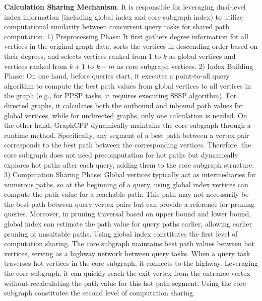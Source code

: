 \documentclass[lettersize,journal]{IEEEtran} %
\begin{document}
{\bf{Calculation Sharing Mechanism}}. It is responsible for leveraging dual-level index information (including global index and core subgraph index) to utilize computational similarity between concurrent query tasks for shared path computation. 1) Preprocessing Phase: It first gathers degree information for all vertices in the original graph data, sorts the vertices in descending order based on their degrees, and selects vertices ranked from 1 to $k$ as global vertices and vertices ranked from $k+1$ to $k+m$ as core subgraph vertices. 2) Index Building Phase: On one hand, before queries start, it executes a point-to-all query algorithm to compute the best path values from global vertices to all vertices in the graph (e.g., for PPSP tasks, it requires executing SSSP algorithm). For directed graphs, it calculates both the outbound and inbound path values for global vertices, while for undirected graphs, only one calculation is needed. On the other hand, GraphCPP dynamically maintains the core subgraph through a runtime method. Specifically, any segment of a best path between a vertex pair corresponds to the best path between the corresponding vertices. Therefore, the core subgraph does not need precomputation for hot paths but dynamically explores hot paths after each query, adding them to the core subgraph structure. 3) Computation Sharing Phase: Global vertices typically act as intermediaries for numerous paths, so at the beginning of a query, using global index vertices can compute the path value for a reachable path. This path may not necessarily be the best path between query vertex pairs but can provide a reference for pruning queries. Moreover, in pruning traversal based on upper bound and lower bound, global index can estimate the path value for query paths earlier, allowing earlier pruning of unsuitable paths. Using global index constitutes the first level of computation sharing. The core subgraph maintains best path values between hot vertices, serving as a highway network between query tasks. When a query task traverses hot vertices in the core subgraph, it connects to the highway. Leveraging the core subgraph, it can quickly reach the exit vertex from the entrance vertex without recalculating the path value for this hot path segment. Using the core subgraph constitutes the second level of computation sharing.
\end{document}
